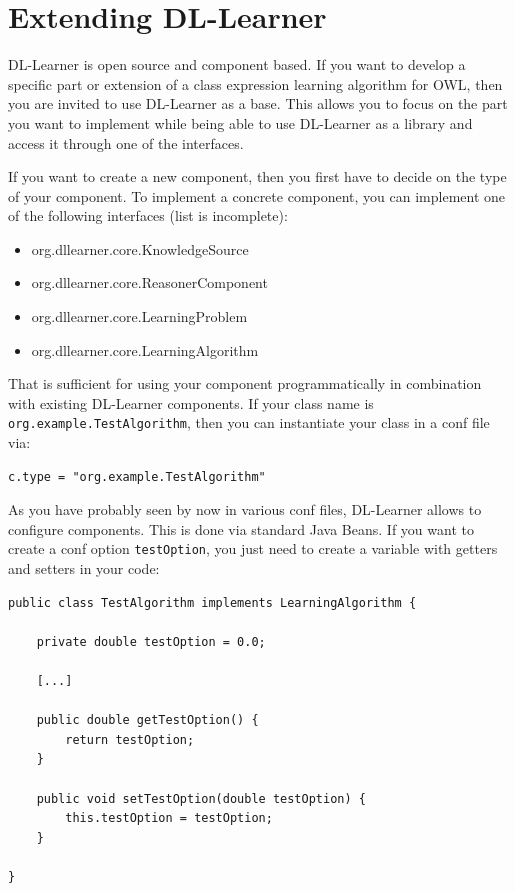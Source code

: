 \documentclass[a4paper,12pt]{scrartcl}
\begin{document}
\section{Extending DL-Learner}
\label{sec:developing}

DL-Learner is open source and component based. If you want to develop a specific part or extension of a class expression learning algorithm for OWL, then you are invited to use DL-Learner as a base. This allows you to focus on the part you want to implement while being able to use DL-Learner as a library and access it through one of the interfaces. 

If you want to create a new component, then you first have to decide on the type of your component. To implement a concrete component, you can implement one of the following interfaces (list is incomplete):

\begin{itemize}
 \item org.dllearner.core.KnowledgeSource
 \item org.dllearner.core.ReasonerComponent
 \item org.dllearner.core.LearningProblem
 \item org.dllearner.core.LearningAlgorithm
\end{itemize}

That is sufficient for using your component programmatically in combination with existing DL-Learner components.
If your class name is \verb|org.example.TestAlgorithm|, then you can instantiate your class in a conf file via:
\begin{verbatim}
c.type = "org.example.TestAlgorithm"
\end{verbatim}

As you have probably seen by now in various conf files, DL-Learner allows to configure components. This is done via standard Java Beans. If you want to create a conf option \verb|testOption|, you just need to create a variable with getters and setters in your code:

\begin{verbatim}
public class TestAlgorithm implements LearningAlgorithm {

    private double testOption = 0.0;

    [...]

    public double getTestOption() {
        return testOption;
    }

    public void setTestOption(double testOption) {
        this.testOption = testOption;
    }

}
\end{verbatim}
\end{document}
